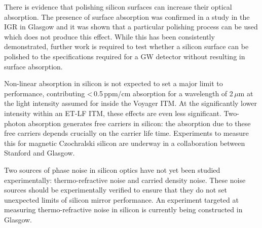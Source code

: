 There is evidence that polishing silicon surfaces can increase their optical absorption. The presence of surface absorption was confirmed in a study in the IGR in Glasgow \cite{SiliconSurfaceAbsorpBell2017} and it was shown that a particular polishing process can be used which does not produce this effect. While this has been consistently demonstrated, further work is required to test whether a silicon surface can be polished to the specifications required for a GW detector without resulting in surface absorption.

Non-linear absorption in silicon is not expected to set a major limit to performance, contributing <\,0.5\,ppm/cm absorption for a wavelength of 2\,$\mu$m at the light intensity assumed for inside the Voyager ITM. At the significantly lower intensity within an ET-LF ITM, these effects are even less significant. Two-photon absorption generates free carriers in silicon: the absorption due to these free carriers depends crucially on the carrier life time. Experiments to measure this for magnetic Czochralski silicon are underway in a collaboration between Stanford and Glasgow.

Two sources of phase noise in silicon optics have not yet been studied experimentally: thermo-refractive noise and carried density noise. These noise sources should be experimentally verified to ensure that they do not set unexpected limits of silicon mirror performance. An experiment targeted at measuring thermo-refractive noise in silicon is currently being constructed in Glasgow.

